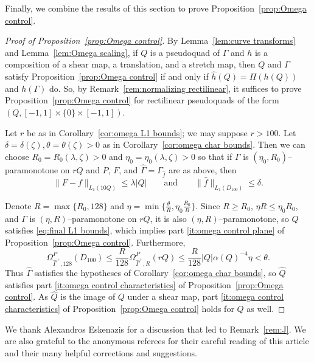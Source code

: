 \documentclass[11pt,reqno]{amsart}
\newcommand{\0}{\mathbf{0}}
\renewcommand{\1}{\mathbf 1}
\renewcommand{\ge}{\geqslant}
\renewcommand{\le}{\leqslant}
\theoremstyle{remark}
\begin{document}
Finally, we combine the results of this section to prove Proposition~\ref{prop:Omega control}.
\begin{proof}[{Proof of Proposition~\ref{prop:Omega control}}]
  By Lemma~\ref{lem:curve transforms} and Lemma~\ref{lem:Omega scaling}, if $Q$ is a pseudoquad of $\Gamma$ and $h$ is a composition of a shear map, a translation, and a stretch map, then $Q$ and $\Gamma$ satisfy Proposition~\ref{prop:Omega control} if and only if $\hat{h}(Q)=\Pi(h(Q))$ and $h(\Gamma)$ do.  So, by Remark~\ref{rem:normalizing rectilinear}, it suffices to prove Proposition~\ref{prop:Omega control}  for rectilinear pseudoquads of the form $(Q,[-1,1]\times \{0\}\times [-1,1])$.

  Let $r$ be as in Corollary~\ref{cor:omega L1 bounds}; we may suppose $r>100$.  Let $\delta=\delta(\zeta),\theta=\theta(\zeta)>0$ as in Corollary~\ref{cor:omega char bounds}.  Then we can choose $R_0=R_0(\lambda,\zeta)>0$ and $\eta_0=\eta_0(\lambda,\zeta)>0$
  so that if $\Gamma$ is $(\eta_0, R_0)$--paramonotone on $rQ$ and $P$, $F$, and $\hat{\Gamma}=\Gamma_{\hat{f}}$ are as above, then
  \begin{equation}
    \|F-f\|_{L_1(10 Q)} \le \lambda |Q| \qquad \mathrm{and} \qquad \|\hat{f}\|_{L_1(D_{100})} \le \delta.\label{eq:final L1 bounds}
  \end{equation}

  Denote $R=\max\{R_0, 128\}$ and $\eta=\min\{\frac{\theta}{R}, \eta_0 \frac{R_0}{R}\}$.  Since $R\ge R_0$, $\eta R \le \eta_0 R_0$, and $\Gamma$ is $(\eta, R)$--paramonotone on $rQ$, it is also $(\eta, R)$--paramonotone, so $Q$ satisfies \eqref{eq:final L1 bounds}, which implies part \ref{it:omega control plane} of Proposition~\ref{prop:Omega control}.  Furthermore,
  $$\Omega^P_{\hat{\Gamma}^+,128}(D_{100})\le \frac{R}{128} \Omega^P_{\hat{\Gamma}^+,R}(rQ) \le \frac{R}{128} |Q| \alpha(Q)^{-4}\eta<\theta.$$
  Thus $\hat{\Gamma}$ satisfies the hypotheses of Corollary~\ref{cor:omega char bounds}, so $\hat{Q}$ satisfies part \ref{it:omega control characteristics} of Proposition~\ref{prop:Omega control}.  As $\hat{Q}$ is the image of $Q$ under a shear map,  part \ref{it:omega control characteristics} of Proposition~\ref{prop:Omega control} holds for $Q$ as well.
\end{proof}

\medskip

 We thank  Alexandros Eskenazis for a discussion that led to Remark~\ref{rem:J}. We are also grateful to the anonymous referees for their careful reading of this article and their many helpful corrections and suggestions.
\end{document}

